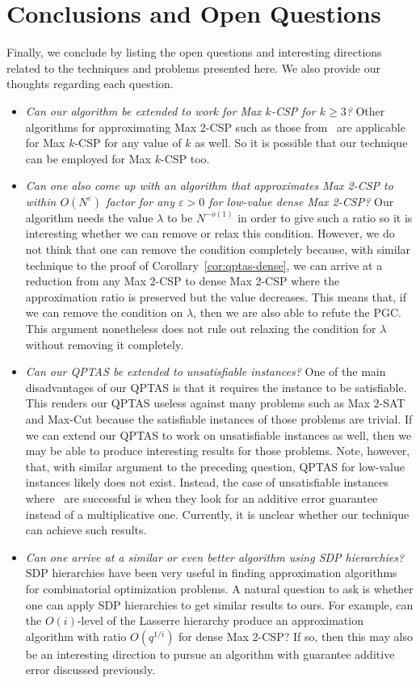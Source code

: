 \documentclass{article}
\begin{document}
\section{Conclusions and Open Questions}
Finally, we conclude by listing the open questions and interesting directions related to the techniques and problems presented here. We also provide our thoughts regarding each question.
\begin{itemize}
\item {\em Can our algorithm be extended to work for {\sc Max $k$-CSP} for $k \geq 3$?} Other algorithms for approximating {\sc Max 2-CSP} such as those from~\cite{Alon:2003:RSA:963875.963877, AKK95, BMHS11} are applicable for {\sc Max $k$-CSP} for any value of $k$ as well. So it is possible that our technique can be employed for {\sc Max $k$-CSP} too.
\item {\em Can one also come up with an algorithm that approximates {\sc Max 2-CSP} to within $O(N^\varepsilon)$ factor for any $\varepsilon > 0$ for low-value dense {\sc Max 2-CSP}?} Our algorithm needs the value $\lambda$ to be $N^{-o(1)}$ in order to give such a ratio so it is interesting whether we can remove or relax this condition. However, we do not think that one can remove the condition completely because, with similar technique to the proof of Corollary~\ref{cor:qptas-dense}, we can arrive at a reduction from any {\sc Max 2-CSP} to dense {\sc Max 2-CSP} where the approximation ratio is preserved but the value decreases. This means that, if we can remove the condition on $\lambda$, then we are also able to refute the PGC. This argument nonetheless does not rule out relaxing the condition for $\lambda$ without removing it completely.
\item {\em Can our QPTAS be extended to unsatisfiable instances?} One of the main disadvantages of our QPTAS is that it requires the instance to be satisfiable. This renders our QPTAS useless against many problems such as {\sc Max $2$-SAT} and {\sc Max-Cut} because the satisfiable instances of those problems are trivial. If we can extend our QPTAS to work on unsatisfiable instances as well, then we may be able to produce interesting results for those problems.  Note, however, that, with similar argument to the preceding question, QPTAS for low-value instances likely does not exist. Instead, the case of unsatisfiable instances where~\cite{Alon:2003:RSA:963875.963877, AKK95, BMHS11} are successful is when they look for an additive error guarantee instead of a multiplicative one. Currently, it is unclear whether our technique can achieve such results.
\item {\em Can one arrive at a similar or even better algorithm using SDP hierarchies?} SDP hierarchies have been very useful in finding approximation algorithms for combinatorial optimization problems. A natural question to ask is whether one can apply SDP hierarchies to get similar results to ours. For example, can the $O(i)$-level of the Lasserre hierarchy produce an approximation algorithm with ratio $O(q^{1/i})$ for dense {\sc Max 2-CSP}? If so, then this may also be an interesting direction to pursue an algorithm with guarantee additive error discussed previously.
\end{itemize}




\end{document}
